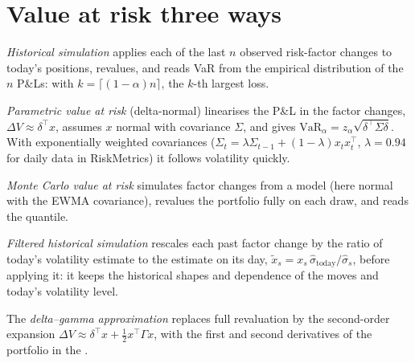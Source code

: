 \section{Value at risk three ways}

\begin{definition}\label{def:rc:market-risk-measures:hs}
\emph{Historical simulation} applies each of the last $n$
observed risk-factor changes to today's positions, revalues, and reads VaR from the empirical
distribution of the $n$ P\&Ls: with $k = \lceil(1-\alpha)n\rceil$, the $k$-th largest loss.
\end{definition}

\begin{definition}\label{def:rc:market-risk-measures:param}
\emph{Parametric value at risk} (delta-normal) linearises the
P\&L in the factor changes, $\Delta V\approx\delta^\top x$, assumes $x$ normal with covariance $\Sigma$, and
gives $\mathrm{VaR}_\alpha = z_\alpha\sqrt{\delta^\top\Sigma\delta}$. With exponentially weighted covariances
($\Sigma_t = \lambda\Sigma_{t-1}+(1-\lambda)x_tx_t^\top$, $\lambda = 0.94$ for daily data in RiskMetrics) it
follows volatility quickly.
\end{definition}

\begin{definition}\label{def:rc:market-risk-measures:mc}
\emph{Monte Carlo value at risk} simulates factor changes
from a model (here normal with the EWMA covariance), revalues the portfolio fully on each
draw, and reads the quantile.
\end{definition}

\begin{definition}\label{def:rc:market-risk-measures:fhs}
\emph{Filtered historical simulation} rescales each
past factor change by the ratio of today's volatility estimate to the estimate on its day,
$\tilde x_s = x_s\,\hat\sigma_{\text{today}}/\hat\sigma_s$, before applying it: it keeps the historical
shapes and dependence of the moves and today's volatility level.
\end{definition}

\begin{definition}\label{def:rc:market-risk-measures:dg}
The \emph{delta--gamma approximation} replaces full
revaluation by the second-order expansion $\Delta V\approx\delta^\top x+\tfrac12x^\top\Gamma x$, with the
first and second derivatives of the portfolio in the .
\end{definition}

